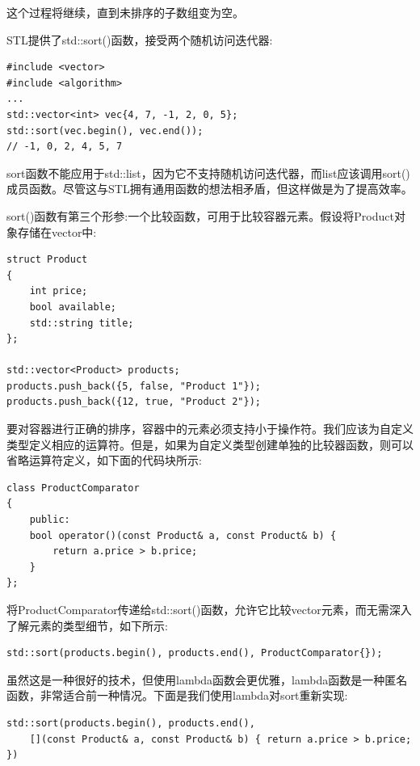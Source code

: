 这个过程将继续，直到未排序的子数组变为空。 \par
STL提供了std::sort()函数，接受两个随机访问迭代器: \par

\begin{lstlisting}[caption={}]
#include <vector>
#include <algorithm>
...
std::vector<int> vec{4, 7, -1, 2, 0, 5};
std::sort(vec.begin(), vec.end());
// -1, 0, 2, 4, 5, 7
\end{lstlisting}

sort函数不能应用于std::list，因为它不支持随机访问迭代器，而list应该调用sort()成员函数。尽管这与STL拥有通用函数的想法相矛盾，但这样做是为了提高效率。 \par
sort()函数有第三个形参:一个比较函数，可用于比较容器元素。假设将Product对象存储在vector中: \par

\begin{lstlisting}[caption={}]
struct Product
{
	int price;
	bool available;
	std::string title;
};

std::vector<Product> products;
products.push_back({5, false, "Product 1"});
products.push_back({12, true, "Product 2"});
\end{lstlisting}

要对容器进行正确的排序，容器中的元素必须支持小于操作符。我们应该为自定义类型定义相应的运算符。但是，如果为自定义类型创建单独的比较器函数，则可以省略运算符定义，如下面的代码块所示: \par

\begin{lstlisting}[caption={}]
class ProductComparator
{
	public:
	bool operator()(const Product& a, const Product& b) {
		return a.price > b.price;
	}
};
\end{lstlisting}

将ProductComparator传递给std::sort()函数，允许它比较vector元素，而无需深入了解元素的类型细节，如下所示: \par

\begin{lstlisting}[caption={}]
std::sort(products.begin(), products.end(), ProductComparator{});
\end{lstlisting}

虽然这是一种很好的技术，但使用lambda函数会更优雅，lambda函数是一种匿名函数，非常适合前一种情况。下面是我们使用lambda对sort重新实现: \par

\begin{lstlisting}[caption={}]
std::sort(products.begin(), products.end(),
	[](const Product& a, const Product& b) { return a.price > b.price; })
\end{lstlisting}


